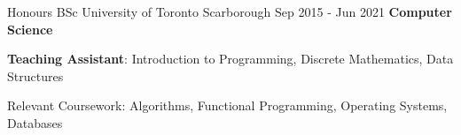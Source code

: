 
\begin{cventries}
  \cventry
    {Honours BSc}
    {University of Toronto}
    {Scarborough}
    {Sep 2015 - Jun 2021}
    {\textbf{Computer Science}}
    {
      \begin{cvitems}
        \item {\textbf{Teaching Assistant}: Introduction to Programming, Discrete Mathematics, Data Structures}
        \item {Relevant Coursework: Algorithms, Functional Programming, Operating Systems, Databases}
      \end{cvitems}
    }
\end{cventries}
